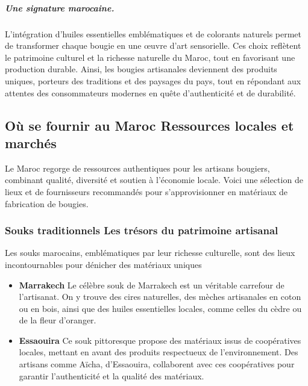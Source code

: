 \documentclass[11pt,fleqn,onecolumn,oneside]{book}
\begin{document}
\subparagraph{Une signature marocaine.} 
L’intégration d’huiles essentielles emblématiques et de colorants naturels permet de transformer chaque bougie en une œuvre d’art sensorielle. Ces choix reflètent le patrimoine culturel et la richesse naturelle du Maroc, tout en favorisant une production durable. Ainsi, les bougies artisanales deviennent des produits uniques, porteurs des traditions et des paysages du pays, tout en répondant aux attentes des consommateurs modernes en quête d’authenticité et de durabilité.

\subsection*{Où se fournir au Maroc Ressources locales et marchés}

Le Maroc regorge de ressources authentiques pour les artisans bougiers, combinant qualité, diversité et soutien à l'économie locale. Voici une sélection de lieux et de fournisseurs recommandés pour s'approvisionner en matériaux de fabrication de bougies.

\subsubsection*{Souks traditionnels Les trésors du patrimoine artisanal}
Les souks marocains, emblématiques par leur richesse culturelle, sont des lieux incontournables pour dénicher des matériaux uniques
\begin{itemize}
    \item \textbf{Marrakech} Le célèbre souk de Marrakech est un véritable carrefour de l’artisanat. On y trouve des cires naturelles, des mèches artisanales en coton ou en bois, ainsi que des huiles essentielles locales, comme celles du cèdre ou de la fleur d’oranger.
    \item \textbf{Essaouira} Ce souk pittoresque propose des matériaux issus de coopératives locales, mettant en avant des produits respectueux de l’environnement. Des artisans comme Aïcha, d’Essaouira, collaborent avec ces coopératives pour garantir l'authenticité et la qualité des matériaux.
\end{itemize}
\end{document}

